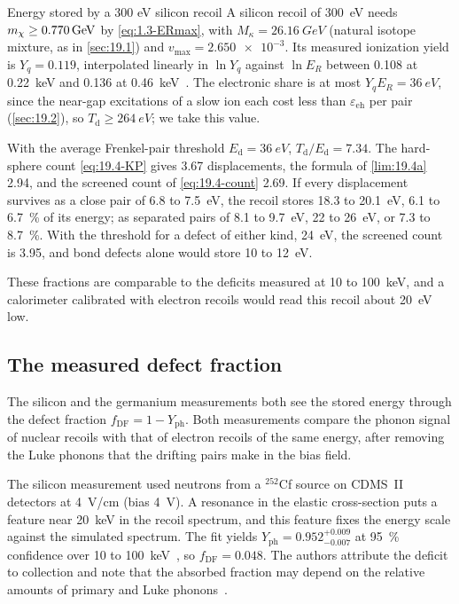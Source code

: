 \begin{workedexample}{Energy stored by a 300 eV silicon recoil}\label{we:19-fp300}
A silicon recoil of \SI{300}{eV} needs $m_{\chi} \ge \SI{0.770}{GeV}$ by \cref{eq:1.3-ERmax}, with $M_\kappa = \SI{26.16}{GeV}$ (natural isotope mixture, as in \cref{sec:19.1}) and $v_{\mathrm{max}} = \num{2.650e-3}$. Its measured ionization yield is $Y_q = 0.119$, interpolated linearly in $\ln Y_q$ against $\ln E_R$ between 0.108 at \SI{0.22}{keV} and 0.136 at \SI{0.46}{keV}~\cite[Table~II]{albakry2023first}. The electronic share is at most $Y_qE_R = \SI{36}{eV}$, since the near-gap excitations of a slow ion each cost less than $\varepsilon_{\mathrm{eh}}$ per pair (\cref{sec:19.2}), so $T_{\mathrm{d}} \ge \SI{264}{eV}$; we take this value.

With the average Frenkel-pair threshold $E_{\mathrm{d}} = \SI{36}{eV}$, $T_{\mathrm{d}}/E_{\mathrm{d}} = 7.34$. The hard-sphere count \cref{eq:19.4-KP} gives 3.67 displacements, the formula of \cref{lim:19.4a} 2.94, and the screened count of \cref{eq:19.4-count} 2.69. If every displacement survives as a close pair of 6.8 to \SI{7.5}{eV}, the recoil stores 18.3 to \SI{20.1}{eV}, 6.1 to \SI{6.7}{\percent} of its energy; as separated pairs of 8.1 to \SI{9.7}{eV}, 22 to \SI{26}{eV}, or 7.3 to \SI{8.7}{\percent}. With the threshold for a defect of either kind, \SI{24}{eV}, the screened count is 3.95, and bond defects alone would store 10 to \SI{12}{eV}.

These fractions are comparable to the deficits measured at 10 to \SI{100}{keV}, and a calorimeter calibrated with electron recoils would read this recoil about \SI{20}{eV} low.
\end{workedexample}

\subsection{The measured defect fraction}\label{sec:19.4-calib}

The silicon and the germanium measurements both see the stored energy through the defect fraction $f_{\mathrm{DF}} = 1 - Y_{\mathrm{ph}}$. Both measurements compare the phonon signal of nuclear recoils with that of electron recoils of the same energy, after removing the Luke phonons that the drifting pairs make in the bias field.

The silicon measurement used neutrons from a $^{252}$Cf source on CDMS~II detectors at \SI{4}{V/cm} (bias \SI{4}{V}). A resonance in the elastic cross-section puts a feature near \SI{20}{keV} in the recoil spectrum, and this feature fixes the energy scale against the simulated spectrum. The fit yields $Y_{\mathrm{ph}} = 0.952^{+0.009}_{-0.007}$ at \SI{95}{\percent} confidence over 10 to \SI{100}{keV}~\cite[Sects.~2 and 3.2]{agnese2018nuclear}, so $f_{\mathrm{DF}} = 0.048$. The authors attribute the deficit to collection and note that the absorbed fraction may depend on the relative amounts of primary and Luke phonons~\cite[Sect.~2]{agnese2018nuclear}.

